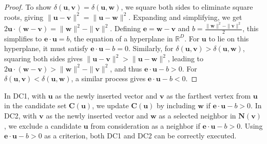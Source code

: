 \begin{proof}
To show $\delta(\boldsymbol{u}, \boldsymbol{v}) = \delta(\boldsymbol{u}, \boldsymbol{w})$, we square both sides to eliminate square roots, giving $\|\boldsymbol{u} - \boldsymbol{v} \|^2 = \| \boldsymbol{u} - \boldsymbol{w} \|^2$. Expanding and simplifying, we get $2\boldsymbol{u} \cdot (\boldsymbol{w} - \boldsymbol{v}) = \|\boldsymbol{w}\|^2 - \|\boldsymbol{v}\|^2$.
Defining $\boldsymbol{e} = \boldsymbol{w} - \boldsymbol{v}$ and $b = \frac{\|\boldsymbol{w}\|^2 - \|\boldsymbol{v}\|^2}{2}$, this simplifies to $\boldsymbol{e} \cdot \boldsymbol{u} = b$, the equation of a hyperplane in $\mathbb{R}^D$. For $\boldsymbol{u}$ to lie on this hyperplane, it must satisfy $\boldsymbol{e} \cdot \boldsymbol{u} - b = 0$. Similarly, for \(\delta(\boldsymbol{u}, \boldsymbol{v}) > \delta(\boldsymbol{u}, \boldsymbol{w})\), squaring both sides gives $\|\boldsymbol{u} - \boldsymbol{v}\|^2 > \|\boldsymbol{u} - \boldsymbol{w}\|^2$, leading to $2\boldsymbol{u} \cdot (\boldsymbol{w} - \boldsymbol{v}) > \|\boldsymbol{w}\|^2 - \|\boldsymbol{v}\|^2$, and thus $\boldsymbol{e} \cdot \boldsymbol{u} - b > 0$. For \(\delta(\boldsymbol{u}, \boldsymbol{v}) < \delta(\boldsymbol{u}, \boldsymbol{w})\), a similar process gives $\boldsymbol{e} \cdot \boldsymbol{u} - b < 0$.
\end{proof}

In DC1, with $\boldsymbol{u}$ as the newly inserted vector and $\boldsymbol{v}$ as the farthest vertex from $\boldsymbol{u}$ in the candidate set $\boldsymbol{C(u)}$, we update $\boldsymbol{C(u)}$ by including $\boldsymbol{w}$ if $\boldsymbol{e} \cdot \boldsymbol{u} - b > 0$. In DC2, with $\boldsymbol{v}$ as the newly inserted vector and $\boldsymbol{w}$ as a selected neighbor in $\boldsymbol{N(v)}$, we exclude a candidate $\boldsymbol{u}$ from consideration as a neighbor if $\boldsymbol{e} \cdot \boldsymbol{u} - b > 0$. Using $\boldsymbol{e} \cdot \boldsymbol{u} - b > 0$ as a criterion, both DC1 and DC2 can be correctly executed.

